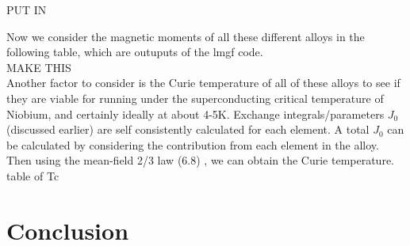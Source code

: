 \documentclass[12pt]{article}
\begin{document}
PUT IN

Now we consider the magnetic moments of all these different alloys in the following table, which are outuputs of the lmgf code.
\\ 
MAKE THIS
\\
\clearpage
Another factor to consider is the Curie temperature of all of these alloys to see if they are viable for running under the superconducting critical temperature of Niobium, and certainly ideally at about 4-5K. Exchange integrals/parameters $J_0$ (discussed earlier) are self consistently calculated for each element. A total $J_0$ can be calculated by considering the contribution from each element in the alloy. Then using the mean-field 2/3 law (6.8) , we can obtain the Curie temperature. 
\\
table of Tc
\\




\section{Conclusion}



\clearpage
\printbibliography
\end{document}
